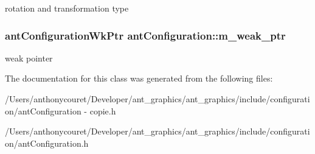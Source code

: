rotation and transformation type \hypertarget{classant_configuration_a0ee5b6d1666f12fc211e274023780510}{
\subsubsection[{m\+\_\+weak\+\_\+ptr}]{\setlength{\rightskip}{0pt plus 5cm}ant\+Configuration\+Wk\+Ptr ant\+Configuration\+::m\+\_\+weak\+\_\+ptr\hspace{0.3cm}{\ttfamily [private]}}}\label{classant_configuration_a0ee5b6d1666f12fc211e274023780510}
weak pointer 

The documentation for this class was generated from the following files\+:\begin{DoxyCompactItemize}
\item 
/\+Users/anthonycouret/\+Developer/ant\+\_\+graphics/ant\+\_\+graphics/include/configuration/ant\+Configuration -\/ copie.\+h\item 
/\+Users/anthonycouret/\+Developer/ant\+\_\+graphics/ant\+\_\+graphics/include/configuration/ant\+Configuration.\+h\end{DoxyCompactItemize}
